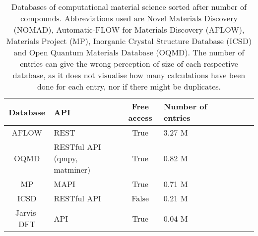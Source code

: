 \begin{table}[!ht]
\centering
\begin{tabular}{clclclclc}
  \hline
  \hline
  Database & API & Free access & Number of entries \\
  \hline
  AFLOW & REST & True &  3.27 M\\
  OQMD \cite{Kirklin2015, Saal2013} & RESTful API (qmpy, matminer)& True &  0.82 M\\
  MP \cite{Jain2013}   & MAPI \cite{Ong2015} & True &  0.71 M\\
  ICSD \cite{Levin2020} & RESTful API & False &  0.21 M\\
  Jarvis-DFT  & API & True &  0.04 M\\
  \hline
  \hline
\end{tabular}
\caption{Databases of computational material science sorted after number of compounds. Abbreviations used are Novel Materials Discovery (NOMAD), Automatic-FLOW for Materials Discovery (AFLOW), Materials Project (MP), Inorganic Crystal Structure Database (ICSD) and Open Quantum Materials Database (OQMD). The number of entries can give the wrong perception of size of each respective database, as it does not visualise how many calculations have been done for each entry, nor if there might be duplicates.}
\label{tab:databases}
\end{table}

\begin{table}[!ht]
\centering
\noindent{}
\caption{Cloud services that offers database-storage. Abbreviations used are Computational Materials Repository (CMR), NIMS Materials Database (MatNavi), PRedictive Integrated Structural Materials Science (PRISMS), Materials Platform for Data Science (MPDS) and the Materials Data Fascility (MDF).}
\label{tab:cloud_service}
\end{table}


